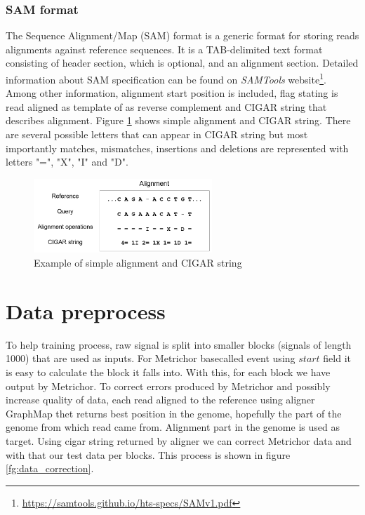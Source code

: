\documentclass[times, utf8, diplomski, numeric, english]{fer}
\begin{document}
\subsubsection{SAM format}
The Sequence Alignment/Map (SAM) format is a generic format for storing
reads alignments against reference sequences. It is a TAB-delimited text format consisting
of header section, which is optional, and an alignment section. Detailed information about SAM specification can be found on \textit{SAMTools} website\footnote{\url{https://samtools.github.io/hts-specs/SAMv1.pdf}}.
Among other information, alignment start position is included, flag stating is read aligned as template of as reverse complement and CIGAR string that describes alignment.
 Figure \ref{fg:align} shows simple alignment and CIGAR string. 
There are several possible letters that can appear in CIGAR string but most importantly matches, mismatches, insertions and deletions are represented with letters "=", "X", "I" and "D".

 
\begin{figure}[!ht]
	\begin{center}
		\includegraphics[width=0.6\textwidth]{./imgs/alignment.png}
		\caption{Example of simple alignment and CIGAR string}
		\label{fg:align}
	\end{center}
\end{figure} 


\section{Data preprocess}


To help training process, raw signal is split into smaller blocks (signals of length 1000) that are used as inputs. For Metrichor basecalled event using $start$ field it is easy to calculate the block it falls into. With this, for each block we have output by Metrichor. 
To correct errors produced by Metrichor and possibly increase quality of data, each read aligned to the reference using aligner GraphMap thet returns best position in the genome, hopefully the part of the genome from which read came from.
Alignment part in the genome is used as target. Using cigar string returned by aligner we can correct Metrichor data and with that our test data per blocks. This process is shown in figure \ref{fg:data_correction}.
\end{document}
